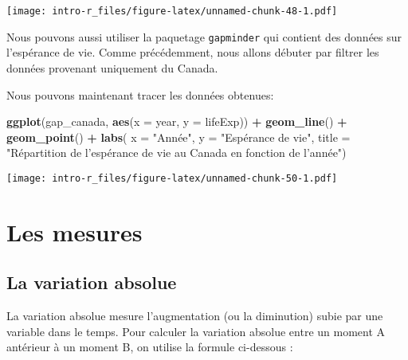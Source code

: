 \documentclass[]{book}
\newenvironment{Shaded}{\begin{snugshade}}{\end{snugshade}}
\newcommand{\KeywordTok}[1]{\textcolor[rgb]{0.13,0.29,0.53}{\textbf{#1}}}
\newcommand{\DataTypeTok}[1]{\textcolor[rgb]{0.13,0.29,0.53}{#1}}
\newcommand{\StringTok}[1]{\textcolor[rgb]{0.31,0.60,0.02}{#1}}
\newcommand{\OperatorTok}[1]{\textcolor[rgb]{0.81,0.36,0.00}{\textbf{#1}}}
\newcommand{\NormalTok}[1]{#1}
\begin{document}
\texttt{[image: intro-r\_files/figure-latex/unnamed-chunk-48-1.pdf]}

Nous pouvons aussi utiliser la paquetage \texttt{gapminder} qui contient
des données sur l'espérance de vie. Comme précédemment, nous allons
débuter par filtrer les données provenant uniquement du Canada.

\begin{Shaded}
\end{Shaded}

Nous pouvons maintenant tracer les données obtenues:

\begin{Shaded}
\begin{Highlighting}[]
\KeywordTok{ggplot}\NormalTok{(gap_canada, }\KeywordTok{aes}\NormalTok{(}\DataTypeTok{x =}\NormalTok{ year, }\DataTypeTok{y =}\NormalTok{ lifeExp)) }\OperatorTok{+}\StringTok{ }
\StringTok{  }\KeywordTok{geom_line}\NormalTok{() }\OperatorTok{+}\StringTok{ }\KeywordTok{geom_point}\NormalTok{() }\OperatorTok{+}
\StringTok{  }\KeywordTok{labs}\NormalTok{(}
    \DataTypeTok{x =} \StringTok{"Année"}\NormalTok{,}
    \DataTypeTok{y =} \StringTok{"Espérance de vie"}\NormalTok{,}
    \DataTypeTok{title =} \StringTok{"Répartition de l'espérance de vie au Canada en fonction de l'année"}\NormalTok{)}
\end{Highlighting}
\end{Shaded}

\texttt{[image: intro-r\_files/figure-latex/unnamed-chunk-50-1.pdf]}

\section{Les mesures}\label{les-mesures}

\subsection{La variation absolue}\label{la-variation-absolue}

La variation absolue mesure l'augmentation (ou la diminution) subie par
une variable dans le temps. Pour calculer la variation absolue entre un
moment A antérieur à un moment B, on utilise la formule ci-dessous :
\end{document}
